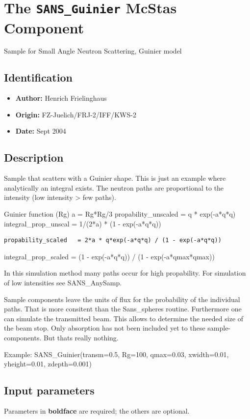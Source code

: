 \section{The \texttt{SANS\_Guinier} McStas Component}
Sample for Small Angle Neutron Scattering, Guinier model

\subsection*{Identification}
\begin{itemize}
  \item \textbf{Author:} Henrich Frielinghaus
  \item \textbf{Origin:} FZ-Juelich/FRJ-2/IFF/KWS-2
  \item \textbf{Date:} Sept 2004
\end{itemize}

\subsection*{Description}
Sample that scatters with a Guinier shape. This is just an example where analytically an integral exists. The neutron paths are proportional to the intensity (low intensity \textgreater{} few paths).

Guinier function (Rg) a = Rg*Rg/3 propability\_unscaled = q * exp(-a*q*q) integral\_prop\_unscal = 1/(2*a) * (1 - exp(-a*q*q))

\begin{verbatim}
propability_scaled   = 2*a * q*exp(-a*q*q) / (1 - exp(-a*q*q))
\end{verbatim}

integral\_prop\_scaled = (1 - exp(-a*q*q)) / (1 - exp(-a*qmax*qmax))

In this simulation method many paths occur for high propability. For simulation of low intensities see SANS\_AnySamp.

Sample components leave the units of flux for the probability of the individual paths. That is more consitent than the Sans\_spheres routine. Furthermore one can simulate the transmitted beam. This allows to determine the needed size of the beam stop. Only absorption has not been included yet to these sample-components. But thats really nothing.

Example: SANS\_Guinier(transm=0.5, Rg=100, qmax=0.03, xwidth=0.01, yheight=0.01, zdepth=0.001)

\subsection*{Input parameters}
Parameters in \textbf{boldface} are required; the others are optional.

